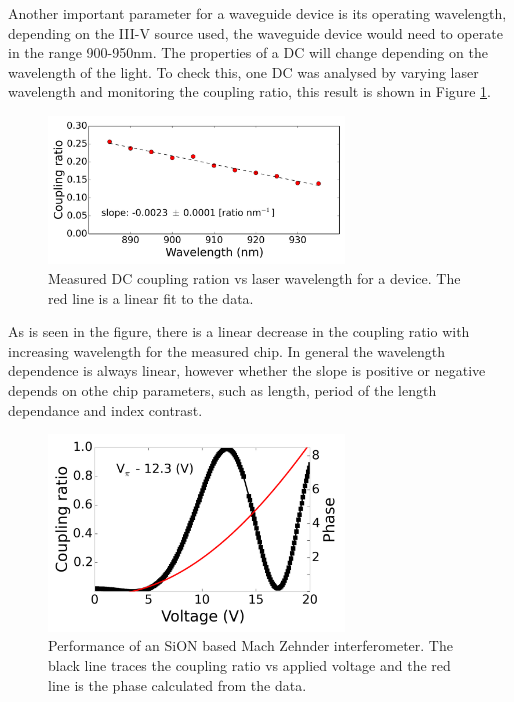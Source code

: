 Another important parameter for a waveguide device is its operating wavelength,
depending on the III-V source used, the waveguide device would need to operate
in the range 900-950nm. The properties of a DC will change depending on the
wavelength of the light. To check this, one DC was analysed by varying laser
wavelength and monitoring the coupling ratio, this result is shown in Figure
\ref{fig:dc_wv}.

\begin{figure}[h!] \begin{center}
\includegraphics[width=0.7\textwidth]{images/W009C01_DV_WV_processing.png}
\caption{Measured DC coupling ration vs laser wavelength for a device. The red
line is a linear fit to the data.} \label{fig:dc_wv} \end{center} \end{figure}

As is seen in the figure, there is a linear decrease in the coupling ratio with
increasing wavelength for the measured chip. In general the wavelength
dependence is always linear, however whether the slope is positive or negative
depends on othe chip parameters, such as length, period of the length dependance
and index contrast.

\begin{figure}[h!] \begin{center}
\includegraphics[width=0.7\textwidth]{images/W010_C06_phase_voltage_MZ1_5_5_6.png}
\caption{Performance of an SiON based Mach Zehnder interferometer. The black
line traces the coupling ratio vs applied voltage and the red line is the phase
calculated from the data.} \label{fig:mz} \end{center} \end{figure}

